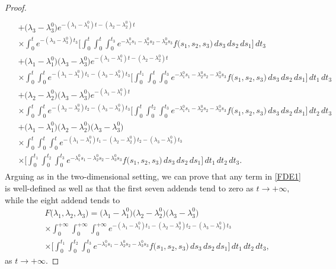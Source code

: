 \documentclass[10pt,a4paper]{amsart}
\begin{document}
\begin{proof}
{\begin{align}
\begin{split}
\\& +\bigl( \lambda_{3}-\lambda_{3}^{0}\bigr)e^{-(\lambda_{1}-\lambda_{1}^{0})t-(\lambda_{2}-\lambda_{2}^{0})t}
\\& \times \int^{t}_{0}e^{-(\lambda_{3}-\lambda_{3}^{0})t_{3}}\Biggl[ \int^{t}_{0}\int^{t}_{0}\int^{t_{3}}_{0}e^{-\lambda_{1}^{0}s_{1}-\lambda_{2}^{0}s_{2}-\lambda_{3}^{0}s_{3}}f\bigl( s_{1},s_{2},s_{3}\bigr)\, ds_{3} \, ds_{2}\, ds_{1} \Biggr]\, dt_{3}
\\& +\bigl( \lambda_{1}-\lambda_{1}^{0}\bigr)\bigl( \lambda_{3}-\lambda_{3}^{0}\bigr)e^{-(\lambda_{1}-\lambda_{1}^{0})t-(\lambda_{2}-\lambda_{2}^{0})t}
\\& \times \int^{t}_{0}\int^{t}_{0}e^{-(\lambda_{1}-\lambda_{1}^{0})t_{1}-(\lambda_{3}-\lambda_{3}^{0})t_{3}}\Biggl[ \int^{t_{1}}_{0}\int^{t}_{0}\int^{t_{3}}_{0}e^{-\lambda_{1}^{0}s_{1}-\lambda_{2}^{0}s_{2}-\lambda_{3}^{0}s_{3}}f\bigl( s_{1},s_{2},s_{3}\bigr)\, ds_{3} \, ds_{2}\, ds_{1} \Biggr]\, dt_{1}\, dt_{3}
\\& +\bigl( \lambda_{2}-\lambda_{2}^{0}\bigr)\bigl( \lambda_{3}-\lambda_{3}^{0}\bigr)e^{-(\lambda_{1}-\lambda_{1}^{0})t}
\\& \times \int^{t}_{0}\int^{t}_{0}e^{-(\lambda_{2}-\lambda_{2}^{0})t_{2}-(\lambda_{3}-\lambda_{3}^{0})t_{3}}\Biggl[ \int^{t}_{0}\int^{t_{2}}_{0}\int^{t_{3}}_{0}e^{-\lambda_{1}^{0}s_{1}-\lambda_{2}^{0}s_{2}-\lambda_{3}^{0}s_{3}}f\bigl( s_{1},s_{2},s_{3}\bigr)\, ds_{3} \, ds_{2}\, ds_{1} \Biggr]\, dt_{2}\, dt_{3}
\\& +\bigl( \lambda_{1}-\lambda_{1}^{0}\bigr)\bigl( \lambda_{2}-\lambda_{2}^{0}\bigr)\bigl( \lambda_{3}-\lambda_{3}^{0}\bigr)
\\& \times \int^{t}_{0}\int^{t}_{0}\int^{t}_{0}e^{-(\lambda_{1}-\lambda_{1}^{0})t_{1}-(\lambda_{2}-\lambda_{2}^{0})t_{2}-(\lambda_{3}-\lambda_{3}^{0})t_{3}}
\\& \times \Biggl[ \int^{t_{1}}_{0}\int^{t_{2}}_{0}\int^{t_{3}}_{0}e^{-\lambda_{1}^{0}s_{1}-\lambda_{2}^{0}s_{2}-\lambda_{3}^{0}s_{3}}f\bigl( s_{1},s_{2},s_{3}\bigr)\, ds_{3} \, ds_{2}\, ds_{1} \Biggr]\, dt_{1}\, dt_{2}\, dt_{3}.
\end{split}
\end{align}}
Arguing as in the two-dimensional setting, we can prove that any term in \eqref{FDE1} is well-defined as well as that the first seven addends tend to zero as $t\rightarrow +\infty,$ while the eight addend tends to
\begin{align*}
& F\bigl( \lambda_{1},\lambda_{2},\lambda_{3}\bigr)=\bigl( \lambda_{1}-\lambda_{1}^{0}\bigr)\bigl( \lambda_{2}-\lambda_{2}^{0}\bigr)\bigl( \lambda_{3}-\lambda_{3}^{0}\bigr)
\\& \times \int^{+\infty}_{0}\int^{+\infty}_{0}\int^{+\infty}_{0}e^{-(\lambda_{1}-\lambda_{1}^{0})t_{1}-(\lambda_{2}-\lambda_{2}^{0})t_{2}-(\lambda_{3}-\lambda_{3}^{0})t_{3}}
\\& \times \Biggl[ \int^{t_{1}}_{0}\int^{t_{2}}_{0}\int^{t_{3}}_{0}e^{-\lambda_{1}^{0}s_{1}-\lambda_{2}^{0}s_{2}-\lambda_{3}^{0}s_{3}}f\bigl( s_{1},s_{2},s_{3}\bigr)\, ds_{3} \, ds_{2}\, ds_{1} \Biggr]\, dt_{1}\, dt_{2}\, dt_{3},
\end{align*}
as $t\rightarrow +\infty .$
\end{proof}
\end{document}
